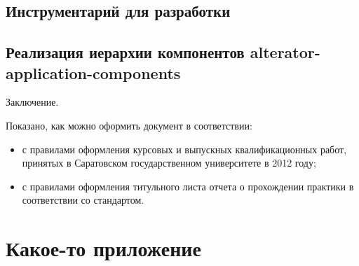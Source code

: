 \documentclass[bachelor, och, pract]{SCWorks}
\begin{document}
\subsection{Инструментарий для разработки}

\subsection{Реализация иерархии компонентов alterator-application-components}

\newpage

\conclusion
Заключение.

Показано, как можно оформить документ в соответствии:
\begin{itemize}
    \item с правилами оформления курсовых и выпускных квалификационных работ, принятых в Саратовском государственном университете в 2012 году;
    \item с правилами оформления титульного листа отчета о прохождении практики в соответствии со стандартом.
\end{itemize}


%

%



\appendix

\section{Какое-то приложение}
\end{document}
